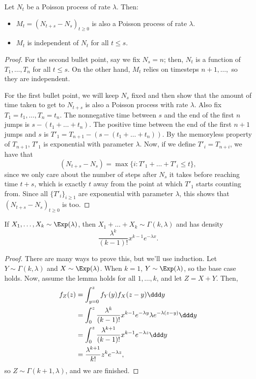 \begin{theorem}
\thmlabel

Let $N_t$ be a Poisson process of rate $\lambda$. Then: 
\begin{itemize}
	\item $M_t = (N_{t+s}-N_s)_{t\geq 0}$ is also a Poisson process of rate $\lambda$. 
	\item $M_t$ is independent of $N_t$ for all $t\leq s$. 
\end{itemize}

\end{theorem}

\begin{proof}
For the second bullet point, say we fix $N_s = n$; then, $N_t$ is a function of $T_1, \hdots, T_n$ for all $t\leq s$. On the other hand, $M_t$ relies on timesteps $n+1,\hdots,$ so they are independent.  


For the first bullet point, we will keep $N_s$ fixed and then show that the amount of time taken to get to $N_{t+s}$ is also a Poisson process with rate $\lambda$. Also fix $T_1 = t_1, \hdots, T_n = t_n$. The nonnegative time between $s$ and the end of the first $n$ jumps is $s - (t_1 + \hdots + t_n)$. The positive time between the end of the first $n+1$ jumps and $s$ is $T'_1 = T_{n+1} - (s - (t_1 + \hdots + t_n))$. By the memoryless property of $T_{n+1}$, $T'_1$ is exponential with parameter $\lambda$. Now, if we define $T'_i = T_{n+i}$, we have that 
	\[(N_{t+s}-N_s) = \max\{i : T'_1 + \hdots + T'_i \leq t\},\]
	since we only care about the number of steps after $N_s$ it takes before reaching time $t+s$, which is exactly $t$ away from the point at which $T'_1$ starts counting from. Since all $\{T'_i\}_{i\geq 1}$ are exponential with parameter $\lambda$, this shows that $(N_{t+s}-N_s)_{t\geq 0}$ is too.  
\end{proof}

\begin{theorem}
\lemlabel

If $X_1, \hdots, X_k\sim \Exp(\lambda)$, then $X_1+\hdots+X_k\sim \Gamma(k,\lambda)$ and has density 
\[\frac{\lambda^k}{(k-1)!}x^{k-1}e^{-\lambda x}. \] 
\end{theorem}

\begin{proof}
There are many ways to prove this, but we'll use induction. Let $Y\sim \Gamma(k, \lambda)$ and $X\sim \Exp(\lambda)$. When $k=1$, $Y\sim \Exp(\lambda)$, so the base case holds. Now, assume the lemma holds for all $1,\hdots,k$, and let $Z = X + Y$. Then, 
\begin{align*}
	f_Z(z) &= \int_{y=0}^z f_Y(y)f_X(z-y)\ddd y \\
				 &= \int_0^z \frac{\lambda^k}{(k-1)!}x^{k-1}e^{-\lambda y}\lambda e^{-\lambda(z-y)}\ddd y\\
				 &= \int_0^z \frac{\lambda^{k+1}}{(k-1)!}x^{k-1}e^{-\lambda z}\ddd y\\
				 &= \frac{\lambda^{k+1}}{k!}z^ke^{-\lambda z},
\end{align*}
so $Z\sim \Gamma(k+1,\lambda)$, and we are finished. 
\end{proof}

